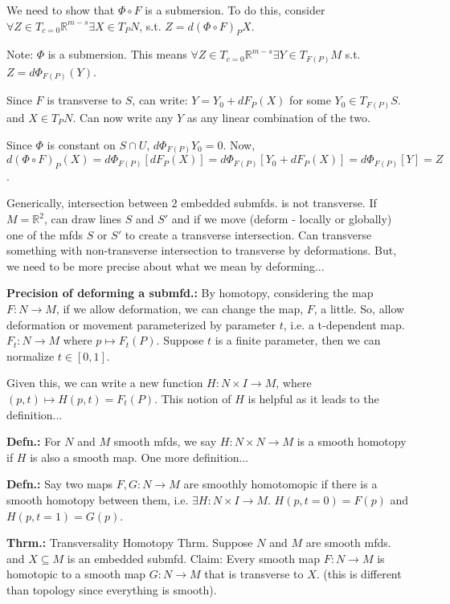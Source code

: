 \documentclass[12pt,letterpaper]{article}
\begin{document}
We need to show that $\Phi \circ F$ is a submersion. To do this, consider $\forall Z \in T_{c=0} \mathbb{R}^{m-s} \exists X \in T_P N$, s.t. $Z=d(\Phi \circ F)_P X$. 

Note: $\Phi$ is a submersion. This means $\forall Z \in T_{c=0}\mathbb{R}^{m-s} \exists Y \in T_{F(P)} M$ s.t. $Z = d\Phi_{F(P)}(Y)$. 

Since $F$ is transverse to $S$, can write: $Y = Y_0 + dF_P(X)$ for some $Y_0 \in T_{F(P)} S$.  and  $X \in T_P N$. Can now write any $Y$ as any linear combination of the two. 

Since $\Phi$ is constant on $S \cap U$, $d\Phi_{F(P)} Y_0 = 0$. Now, $d(\Phi \circ F)_P(X) =  d\Phi_{F(P)}[dF_P(X)] = d\Phi_{F(P)}[Y_0 + dF_P(X)]=d\Phi_{F(P)}[Y]=Z$.

Generically, intersection between 2 embedded submfds. is not transverse. If $M = \mathbb{R}^2$, can draw lines $S$ and $S'$ and if we move (deform - locally or globally) one of the mfds $S$ or $S'$ to create a transverse intersection. Can transverse something with non-transverse intersection to transverse by deformations. But, we need to be more precise about what we mean by deforming...

\textbf{Precision of deforming a submfd.:} By homotopy, considering the map $F: N \rightarrow M$, if we allow deformation, we can change the map, $F$, a little. So, allow deformation or movement parameterized by parameter $t$, i.e. a t-dependent map. $F_t: N \rightarrow M$ where $p \mapsto F_t(P)$. Suppose $t$ is a finite parameter, then we can normalize $t \in [0,1]$. 

Given this, we can write a new function $H: N \times I \rightarrow M$, where $(p,t) \mapsto H(p,t) = F_t(P)$. This notion of $H$ is helpful as it leads to the definition...

\textbf{Defn.:} For $N$ and $M$ smooth mfds, we say $H: N \times N \rightarrow M$ is a smooth homotopy if $H$ is also a smooth map. One more definition...

\textbf{Defn.:} Say two maps $F, G: N \rightarrow M$ are smoothly homotomopic if there is a smooth homotopy between them, i.e. $\exists H: N \times I \rightarrow M$. $H(p, t=0) = F(p)$ and $H(p, t=1) = G(p)$.

\textbf{Thrm.:} Transversality Homotopy Thrm. Suppose $N$ and $M$ are smooth mfds. and $X \subseteq M$ is an embedded submfd. Claim: Every smooth map $F: N \rightarrow M$ is homotopic to a smooth map $G:N \rightarrow M$ that is transverse to $X$. (this is different than topology since everything is smooth). 
\end{document}
